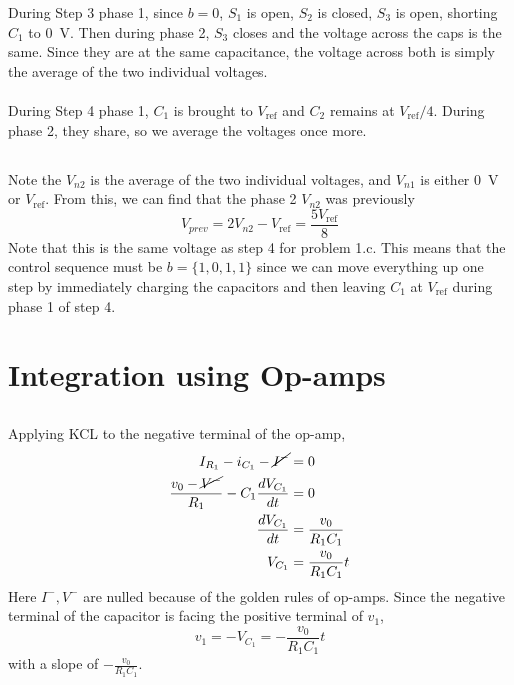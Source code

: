 \documentclass[]{article}
\begin{document}
During Step 3 phase 1, since \(b = 0\), \(S_1\) is open, \(S_2\) is closed, \(S_3\) is open, shorting \(C_1\) to \SI{0}{\volt}. 
Then during phase 2, \(S_3\) closes and the voltage across the caps is the same. 
Since they are at the same capacitance, the voltage across both is simply the average of the two individual voltages. \\
\\
During Step 4 phase 1, \(C_1\) is brought to \(V_{\text{ref}}\) and \(C_2\) remains at \(V_{\text{ref}} / 4\). 
During phase 2, they share, so we average the voltages once more. 

\subsection{}

Note the \(V_{n2}\) is the average of the two individual voltages, and \(V_{n1}\) is either \SI{0}{\volt} or \(V_{\text{ref}}\). 
From this, we can find that the phase 2 \(V_{n2}\) was previously
\begin{equation}
	V_{prev} = 2 V_{n2} - V_{\text{ref}} = \frac{5 V_{\text{ref}}}{8}
\end{equation}
Note that this is the same voltage as step 4 for problem 1.c. 
This means that the control sequence must be \(b = \{1, 0, 1, 1\}\) since we can move everything up one step by immediately charging the capacitors and then leaving \(C_1\) at \(V_{\text{ref}}\) during phase 1 of step 4. 

\section{Integration using Op-amps}

\subsection{}

Applying KCL to the negative terminal of the op-amp, 
\begin{align}
	I_{R_1} - i_{C_1} - \cancel{I^-} &= 0 \\
	\frac{v_0 - \cancel{V^-}}{R_1} - C_1 \frac{d V_{C_1}}{dt} &= 0 \\
	\frac{d V_{C_1}}{dt} &= \frac{v_0}{R_1 C_1} \\
	V_{C_1} &= \frac{v_0}{R_1 C_1} t
\end{align}
Here \(I^-, V^-\) are nulled because of the golden rules of op-amps. 
Since the negative terminal of the capacitor is facing the positive terminal of \(v_1\), 
\begin{equation}
	v_1 = -V_{C_1} = -\frac{v_0}{R_1 C_1} t
\end{equation}
with a slope of \(-\frac{v_0}{R_1 C_1}\). 
\end{document}
